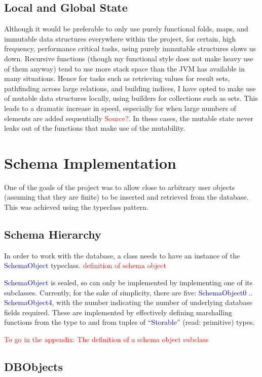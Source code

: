 \documentclass[12pt,a4paper,twoside,openright]{report}
\newcommand\todo[1]{\textcolor{red}{#1}}
\newcommand\codeName[1]{\textcolor{blue}{#1}}
\begin{document}
	
	\subsection{Local and Global State}
Although it would be preferable to only use purely functional folds, maps, and immutable data structures everywhere within the project, for certain, high frequency, performance critical tasks, using purely immutable structures slows us down. Recursive functions (though my functional style does not make heavy use of them anyway) tend to use more stack space than the JVM has available in many situations. Hence for tasks such as retrieving values for result sets,  pathfinding across large relations, and building indices, I have opted to make use of mutable data structures locally, using builders for collections such as sets. This leads to a dramatic increase in speed, especially for when large numbers of elements are added sequentially \todo{Source?}. In these cases, the mutable state never leaks out of the functions that make use of the mutability.	
	
\section{Schema Implementation}
	One of the goals of the project was to allow close to arbitrary user objects (assuming that they are finite) to be inserted and retrieved from the database. This was achieved using the typeclass pattern.
	\subsection{Schema Hierarchy}
	In order to work with the database, a class needs to have an instance of the \codeName{SchemaObject} typeclass.
	\todo{definition of schema object}
	
	\codeName{SchemaObject} is sealed, so can only be implemented by implementing one of its subclasses. Currently, for the sake of simplicity, there are five: \codeName{SchemaObject0} .. \codeName{SchemaObject4}, with the number indicating the number of underlying database fields required. These are implemented by effectively defining marshalling functions from the type to and from tuples of “\codeName{Storable}”  (read: primitive) types.
	
	\todo{To go in the appendix: The definition of a schema object subclass}
	
	\subsection{DBObjects}
	
\end{document}

